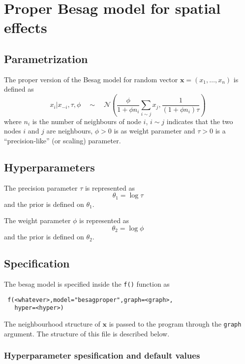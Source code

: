 \documentclass[a4paper,11pt]{article}
\begin{document}
\section*{Proper Besag model for spatial effects}

\subsection*{Parametrization}

The proper version of the Besag model for random vector
$\mathbf{x}=(x_1,\dots,x_n)$ is defined as
\begin{equation}\label{eq.besag}
    x_i|x_{-i},\tau,\phi\quad\sim\quad \mathcal{N}\left(\frac{\phi}{1+\phi
          n_i}\sum_{i\sim j}x_j,\frac{1}{(1 + \phi n_i)\tau}\right)
\end{equation}
where $n_i$ is the number of neighbours of node $i$, $i\sim j$
indicates that the two nodes $i$ and $j$ are neighbours, $\phi > 0$ is
as weight parameter and $\tau > 0$ is a ``precision-like'' (or
scaling) parameter.


\subsection*{Hyperparameters}

The precision parameter $\tau$ is represented as
\begin{displaymath}
    \theta_{1} =\log \tau
\end{displaymath}
and the prior is defined on $\theta_{1}$. 

The weight parameter $\phi$ is represented as
\begin{displaymath}
    \theta_{2} =\log \phi
\end{displaymath}
and the prior is defined on $\theta_{2}$. 

\subsection*{Specification}

The besag model is specified inside the {\tt f()} function as
\begin{verbatim}
 f(<whatever>,model="besagproper",graph=<graph>,
   hyper=<hyper>)
\end{verbatim}

The neighbourhood structure of $\mathbf{x}$ is passed to the program
through the {\tt graph} argument.  The structure of this file is
described below.

\subsubsection*{Hyperparameter spesification and default values}

\end{document}
